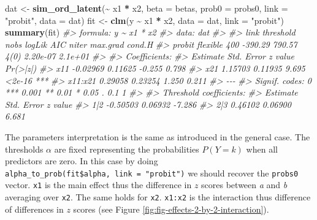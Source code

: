 \documentclass[
  man,floatsintext]{apa6}
\newenvironment{Shaded}{\begin{snugshade}}{\end{snugshade}}
\newcommand{\AttributeTok}[1]{\textcolor[rgb]{0.13,0.29,0.53}{#1}}
\newcommand{\CommentTok}[1]{\textcolor[rgb]{0.56,0.35,0.01}{\textit{#1}}}
\newcommand{\FunctionTok}[1]{\textcolor[rgb]{0.13,0.29,0.53}{\textbf{#1}}}
\newcommand{\NormalTok}[1]{#1}
\newcommand{\OtherTok}[1]{\textcolor[rgb]{0.56,0.35,0.01}{#1}}
\newcommand{\SpecialCharTok}[1]{\textcolor[rgb]{0.81,0.36,0.00}{\textbf{#1}}}
\newcommand{\StringTok}[1]{\textcolor[rgb]{0.31,0.60,0.02}{#1}}
\begin{document}
\begin{Shaded}
\begin{Highlighting}[]
\NormalTok{dat }\OtherTok{\textless{}{-}} \FunctionTok{sim\_ord\_latent}\NormalTok{(}\SpecialCharTok{\textasciitilde{}}\NormalTok{ x1 }\SpecialCharTok{*}\NormalTok{ x2, }\AttributeTok{beta =}\NormalTok{ betas, }\AttributeTok{prob0 =}\NormalTok{ probs0, }\AttributeTok{link =} \StringTok{"probit"}\NormalTok{, }\AttributeTok{data =}\NormalTok{ dat)}
\NormalTok{fit }\OtherTok{\textless{}{-}} \FunctionTok{clm}\NormalTok{(y }\SpecialCharTok{\textasciitilde{}}\NormalTok{ x1 }\SpecialCharTok{*}\NormalTok{ x2, }\AttributeTok{data =}\NormalTok{ dat, }\AttributeTok{link =} \StringTok{"probit"}\NormalTok{)}
\FunctionTok{summary}\NormalTok{(fit)}
\CommentTok{\#\textgreater{} formula: y \textasciitilde{} x1 * x2}
\CommentTok{\#\textgreater{} data:    dat}
\CommentTok{\#\textgreater{} }
\CommentTok{\#\textgreater{}  link   threshold nobs logLik  AIC    niter max.grad cond.H }
\CommentTok{\#\textgreater{}  probit flexible  400  {-}390.29 790.57 4(0)  2.20e{-}07 2.1e+01}
\CommentTok{\#\textgreater{} }
\CommentTok{\#\textgreater{} Coefficients:}
\CommentTok{\#\textgreater{}         Estimate Std. Error z value Pr(\textgreater{}|z|)    }
\CommentTok{\#\textgreater{} x11     {-}0.02969    0.11625  {-}0.255    0.798    }
\CommentTok{\#\textgreater{} x21      1.15703    0.11935   9.695   \textless{}2e{-}16 ***}
\CommentTok{\#\textgreater{} x11:x21  0.29058    0.23254   1.250    0.211    }
\CommentTok{\#\textgreater{} {-}{-}{-}}
\CommentTok{\#\textgreater{} Signif. codes:  0 \textquotesingle{}***\textquotesingle{} 0.001 \textquotesingle{}**\textquotesingle{} 0.01 \textquotesingle{}*\textquotesingle{} 0.05 \textquotesingle{}.\textquotesingle{} 0.1 \textquotesingle{} \textquotesingle{} 1}
\CommentTok{\#\textgreater{} }
\CommentTok{\#\textgreater{} Threshold coefficients:}
\CommentTok{\#\textgreater{}     Estimate Std. Error z value}
\CommentTok{\#\textgreater{} 1|2 {-}0.50503    0.06932  {-}7.286}
\CommentTok{\#\textgreater{} 2|3  0.46102    0.06900   6.681}
\end{Highlighting}
\end{Shaded}

\normalsize

The parameters interpretation is the same as introduced in the general case. The thresholds \(\alpha\) are fixed representing the probabilities \(P(Y = k)\) when all predictors are zero. In this case by doing \texttt{alpha\_to\_prob(fit\$alpha,\ link\ =\ "probit")} we should recover the \texttt{probs0} vector. \texttt{x1} is the main effect thus the difference in \(z\) scores between \emph{a} and \emph{b} averaging over \texttt{x2}. The same holds for \texttt{x2}. \texttt{x1:x2} is the interaction thus difference of differences in \(z\) scores (see Figure \ref{fig:fig-effects-2-by-2-interaction}).
\end{document}
